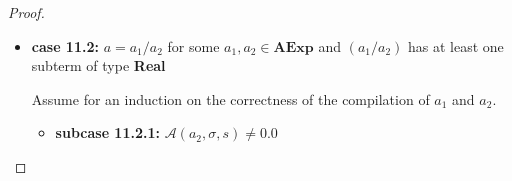\documentclass{article}
\begin{document}
\begin{proof}
\begin{itemize}
\begin{itemize}
            \[
              \begin{aligned}
                \langle  \mathcal{CA}(a) : c,\, e,\, \sigma,\, s,\, pc \rangle 
                &= \langle \mathcal{CA}(a_1 / a_2) : c,\, e,\, \sigma,\, s,\, pc \rangle \\
                &= \langle \mathcal{CA}(a_2) : \mathcal{CA}(a_1) : \texttt{iDIV} :  c,\, e,\, \sigma,\, s,\, pc \rangle 
                && \text{(definition of } \mathcal{CA}\text{)} \\
                &\triangleright^{\ast} \langle \mathcal{CA}(a_1) : \texttt{iDIV} :  c,\, \mathcal{A}(a_2, \sigma, s) : e,\, \sigma,\, s,\, pc + l_2 \rangle 
                && \text{(induction hypothesis 2)} \\
                &= \langle \mathcal{CA}(a_1) : \texttt{iDIV} :  c,\, 0 : e,\, \sigma,\, s,\, pc + l_2 \rangle \\
                &\triangleright^{\ast} \langle \texttt{iDIV} :  c,\, \mathcal{A}(a_1, \sigma, s) : 0 : e,\, \sigma,\, s,\, pc + l_2 + l_1 \rangle 
                && \text{(induction hypothesis 1)} \\
                &\triangleright \langle c,\, \bot : e,\, \hat{\sigma},\, s,\, pc + l_2 + l_1 + 1 \rangle 
                && \text{(operational semantics)} \\
                &= \langle c,\, \mathcal{A}(a_1 / a_2, \sigma, s) : e,\, \hat{\sigma},\, s,\, pc + l_2 + l_1 + 1 \rangle
                && \text{(definition of } \mathcal{A}\text{)} \\
                &= \langle c,\, \mathcal{A}(a, \sigma, s) : e,\, \hat{\sigma},\, s,\, pc + l_2 + l_1 + 1 \rangle \\
              \end{aligned}
          \]
            
        \end{itemize}

    \item \textbf{case 11.2: } $a = a_1 / a_2$ for some $a_1, a_2 \in \textbf{AExp}$ and $(a_1 / a_2)$ has at least one subterm of type \textbf{Real}

    Assume for an induction on the correctness of the compilation of $a_1$ and $a_2$.

        \begin{itemize}
            \item \textbf{subcase 11.2.1: } $\mathcal{A}(a_2, \sigma, s) \neq 0.0$


\end{itemize}
\end{itemize}
\end{proof}
\end{document}
